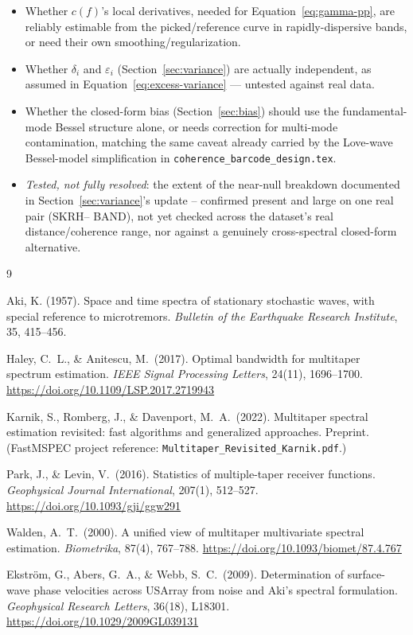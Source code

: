 \documentclass[11pt]{article}
\begin{document}
\begin{itemize}[nosep]
  \item Whether $c(f)$'s local derivatives, needed for Equation~\ref{eq:gamma-pp}, are reliably
    estimable from the picked/reference curve in rapidly-dispersive bands, or need their own
    smoothing/regularization.
  \item Whether $\delta_i$ and $\varepsilon_i$ (Section~\ref{sec:variance}) are actually
    independent, as assumed in Equation~\ref{eq:excess-variance} --- untested against real data.
  \item Whether the closed-form bias (Section~\ref{sec:bias}) should use the fundamental-mode
    Bessel structure alone, or needs correction for multi-mode contamination, matching the same
    caveat already carried by the Love-wave Bessel-model simplification in
    \texttt{coherence\_barcode\_design.tex}.
  \item \emph{Tested, not fully resolved}: the extent of the near-null breakdown documented in
    Section~\ref{sec:variance}'s update -- confirmed present and large on one real pair (SKRH--
    BAND), not yet checked across the dataset's real distance/coherence range, nor against a
    genuinely cross-spectral closed-form alternative.
\end{itemize}

\begin{thebibliography}{9}

Aki, K. (1957). Space and time spectra of stationary stochastic waves, with special reference to
microtremors. \textit{Bulletin of the Earthquake Research Institute}, 35, 415--456.

Haley, C.\ L., \& Anitescu, M.\ (2017). Optimal bandwidth for multitaper spectrum estimation.
\textit{IEEE Signal Processing Letters}, 24(11), 1696--1700.
\url{https://doi.org/10.1109/LSP.2017.2719943}

Karnik, S., Romberg, J., \& Davenport, M.\ A.\ (2022). Multitaper spectral estimation revisited:
fast algorithms and generalized approaches. Preprint. (FastMSPEC project reference:
\texttt{Multitaper\_Revisited\_Karnik.pdf}.)

Park, J., \& Levin, V.\ (2016). Statistics of multiple-taper receiver functions. \textit{Geophysical
Journal International}, 207(1), 512--527. \url{https://doi.org/10.1093/gji/ggw291}

Walden, A.\ T.\ (2000). A unified view of multitaper multivariate spectral estimation.
\textit{Biometrika}, 87(4), 767--788. \url{https://doi.org/10.1093/biomet/87.4.767}

Ekstr\"om, G., Abers, G.\ A., \& Webb, S.\ C.\ (2009). Determination of surface-wave phase
velocities across USArray from noise and Aki's spectral formulation. \textit{Geophysical Research
Letters}, 36(18), L18301. \url{https://doi.org/10.1029/2009GL039131}

\end{thebibliography}
\end{document}

